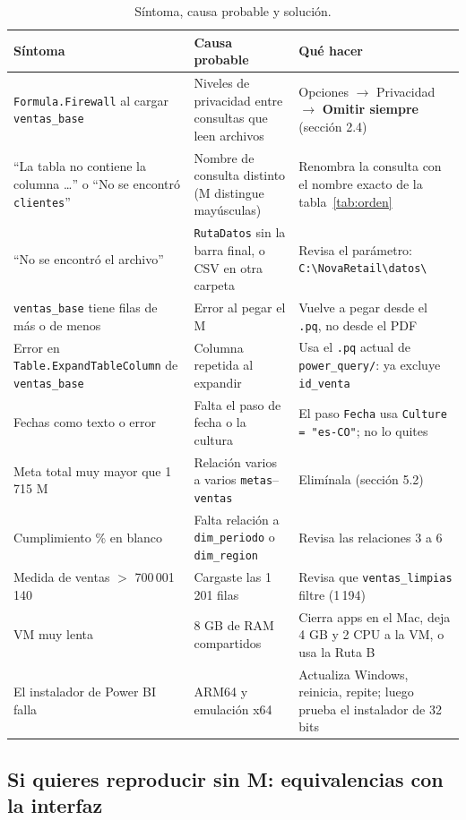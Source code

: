 \documentclass[11pt,letterpaper]{article}
\newcommand{\bs}{\textbackslash}
\newcommand{\ui}[1]{\textbf{#1}}                 %
\begin{document}
\begin{table}[H]
\centering
\caption{Síntoma, causa probable y solución.}
\footnotesize
\begin{tabularx}{\linewidth}{L L L}
\toprule
Síntoma & Causa probable & Qué hacer \\
\midrule
\texttt{Formula.Firewall} al cargar \texttt{ventas\_base} & Niveles de privacidad entre consultas que leen archivos & Opciones $\rightarrow$ Privacidad $\rightarrow$ \ui{Omitir siempre} (sección 2.4) \\
``La tabla no contiene la columna \dots'' o ``No se encontró \texttt{clientes}'' & Nombre de consulta distinto (M distingue mayúsculas) & Renombra la consulta con el nombre exacto de la tabla~\ref{tab:orden} \\
``No se encontró el archivo'' & \texttt{RutaDatos} sin la barra final, o CSV en otra carpeta & Revisa el parámetro: \texttt{C:\bs NovaRetail\bs datos\bs} \\
\texttt{ventas\_base} tiene filas de más o de menos & Error al pegar el M & Vuelve a pegar desde el \texttt{.pq}, no desde el PDF \\
Error en \texttt{Table.ExpandTableColumn} de \texttt{ventas\_base} & Columna repetida al expandir & Usa el \texttt{.pq} actual de \texttt{power\_query/}: ya excluye \texttt{id\_venta} \\
Fechas como texto o error & Falta el paso de fecha o la cultura & El paso \texttt{Fecha} usa \texttt{Culture = "es-CO"}; no lo quites \\
Meta total muy mayor que 1\,715 M & Relación varios a varios \texttt{metas}--\texttt{ventas} & Elimínala (sección 5.2) \\
Cumplimiento \% en blanco & Falta relación a \texttt{dim\_periodo} o \texttt{dim\_region} & Revisa las relaciones 3 a 6 \\
Medida de ventas $>$ 700\,001\,140 & Cargaste las 1\,201 filas & Revisa que \texttt{ventas\_limpias} filtre (1\,194) \\
VM muy lenta & 8 GB de RAM compartidos & Cierra apps en el Mac, deja 4 GB y 2 CPU a la VM, o usa la Ruta B \\
El instalador de Power BI falla & ARM64 y emulación x64 & Actualiza Windows, reinicia, repite; luego prueba el instalador de 32 bits \\
\bottomrule
\end{tabularx}
\end{table}

\subsection{Si quieres reproducir sin M: equivalencias con la interfaz}
\end{document}
